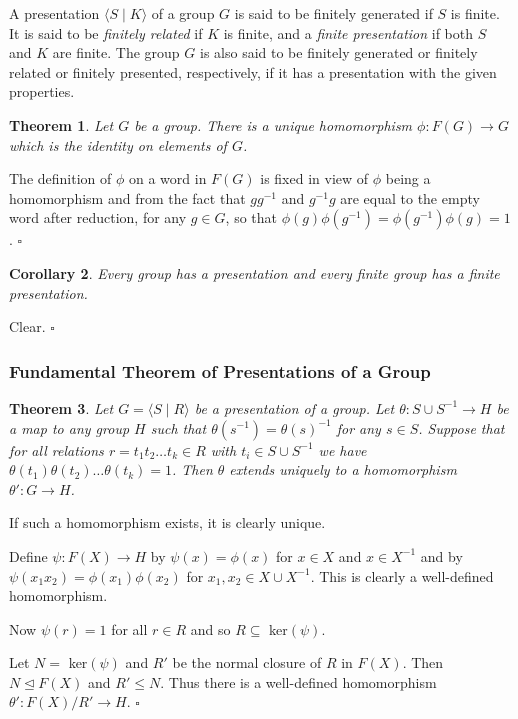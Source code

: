 \documentclass[10pt]{article}
\newtheorem{theorem}{Theorem}[section]
\newtheorem{corollary}[theorem]{Corollary}
\newenvironment{proof}[1][Proof]{\begin{trivlist}
\item[\hskip \labelsep {\itshape #1}]}{\end{trivlist}}
\newenvironment{definition}[1][Definition]{\begin{trivlist}
\item[\hskip \labelsep {\bfseries #1}]}{\end{trivlist}}
\begin{document}
\begin{definition}
A presentation $\langle S \;|\; K \rangle$ of a group $G$ is said to be finitely generated if $S$ is finite. It is said to be \emph{finitely related} if $K$ is finite, and a \emph{finite presentation} if both $S$ and $K$ are finite. The group $G$ is also said to be finitely generated or finitely related or finitely presented, respectively, if it has a presentation with the given properties.
\end{definition}

\begin{theorem}
Let $G$ be a group. There is a unique homomorphism $\phi : F(G) \to G$ which is the identity on elements of $G$.
\end{theorem}

\begin{proof}
The definition of $\phi$ on a word in $F(G)$ is fixed in view of $\phi$ being a homomorphism and from the fact that $gg^{-1}$ and $g^{-1}g$ are equal to the empty word after reduction, for any $g \in G$, so that $\phi(g)\phi(g^{-1}) = \phi(g^{-1})\phi(g) = 1$. $\square$
\end{proof}

\begin{corollary}
Every group has a presentation and every finite group has a finite presentation.
\end{corollary}

\begin{proof}
Clear. $\square$
\end{proof}

\subsubsection{Fundamental Theorem of Presentations of a Group}

\begin{theorem}
Let $G = \langle S \;|\; R \rangle$ be a presentation of a group. Let $\theta : S\cup S^{-1} \to H$ be a map to any group $H$ such that $\theta(s^{-1}) = \theta(s)^{-1}$ for any $s \in S$. Suppose that for all relations $r = t_1t_2\ldots t_k \in R$ with $t_i \in S\cup S^{-1}$ we have $\theta(t_1)\theta(t_2)\ldots \theta(t_k) = 1$. Then $\theta$ extends uniquely to a homomorphism $\theta' : G \to H$.
\end{theorem}

\begin{proof}
If such a homomorphism exists, it is clearly unique.

Define $\psi : F(X) \to H$ by $\psi(x) = \phi(x)$ for $x \in X$ and $x \in X^{-1}$ and by $\psi(x_1x_2) = \phi(x_1)\phi(x_2)$ for $x_1, x_2 \in X\cup X^{-1}$. This is clearly a well-defined homomorphism.

Now $\psi(r) = 1$ for all $r \in R$ and so $R \subseteq$ ker$(\psi)$.

Let $N =$ ker$(\psi)$ and $R'$ be the normal closure of $R$ in $F(X)$. Then $N \mathrel{\unlhd} F(X)$ and $R' \leq N$. Thus there is a well-defined homomorphism $\theta' : F(X)/R' \to H$. $\square$
\end{proof}
\end{document}

